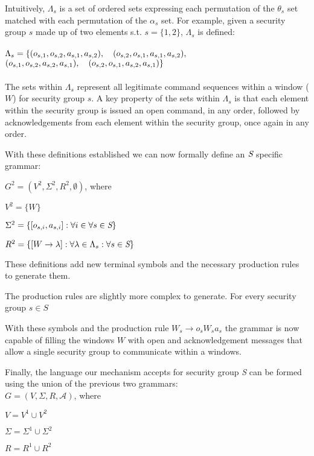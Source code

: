 \documentclass{article}
\newcommand{\tab}{\hspace*{2em}}
\begin{document}
Intuitively, $\Lambda_s$ is a set of ordered sets expressing each permutation of the $\theta_s$ set matched with each permutation of the $\alpha_s$ set. For example, given a security group $s$ made up of two elements s.t. $s = \{1, 2\}$, $\Lambda_s$ is defined:\\
\\
$\Lambda_s = \{ (o_{s,1}, o_{s,2}, a_{s,1}, a_{s,2}),\hspace*{1.0em} (o_{s,2}, o_{s,1}, a_{s,1}, a_{s,2}),$\\
\hspace*{3.0em}$ (o_{s,1}, o_{s,2}, a_{s,2}, a_{s,1}),\hspace*{1.0em} (o_{s,2}, o_{s,1}, a_{s,2}, a_{s,1})\}$\\
\\
The sets within $\Lambda_s$ represent all legitimate command sequences within a window ($W$) for security group $s$. A key property of the sets within $\Lambda_s$ is that each element within the security group is issued an open command, in any order, followed by acknowledgements from each element within the security group, once again in any order.

With these definitions established we can now formally define an $\emph{S}$ specific grammar:

\tab $G^2 = (V^2, \Sigma^2, R^2, \emptyset)$, where

\tab $V^2 =\{W\}$

\tab $\Sigma ^2 = \{[o_{s,i}, a_{s,i}]:\forall i \in \forall s\in \emph{S}\}$

\tab $R^2 = \{[W\rightarrow \lambda  ] :\forall \lambda \in \Lambda_s :\forall s\in \emph{S}\}$


These definitions add new terminal symbols and the necessary production rules to generate them. 

The production rules are slightly more complex to generate. For every security group $s\in S$

With these symbols and the production rule $W_s\rightarrow o_sW_sa_s$ the grammar is now capable of filling the windows $W$ with open and acknowledgement messages that allow a single security group to communicate within a windows.

Finally, the language our mechanism accepts for security group \emph{S} can be formed using the union of the previous two grammars:\\

\tab $G = (V, \Sigma , R, \mathcal{A})$, where

\tab $V = V^1\cup V^2$

\tab $\Sigma = \Sigma ^1\cup \Sigma ^2$

\tab $R = R^1\cup R^2$
\end{document}
